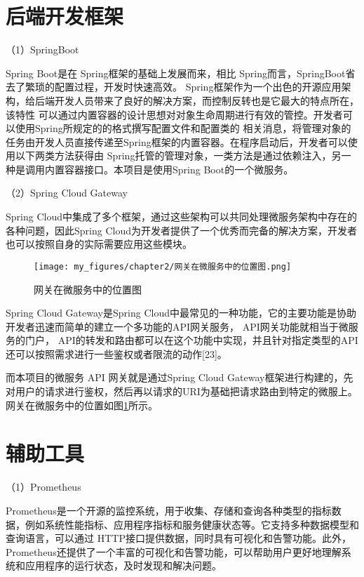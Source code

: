 \section{后端开发框架}

（1）SpringBoot


Spring Boot是在 Spring框架的基础上发展而来\cite{konggyong2015keji}，相比 Spring而言，SpringBoot省去了繁琐的配置过程，开发时快速高效。
Spring框架作为一个出色的开源应用架构，给后端开发人员带来了良好的解决方案，而控制反转也是它最大的特点所在，该特性
可以通过内置容器的设计思想对对象生命周期进行有效的管控。开发者可以使用Spring所规定的的格式撰写配置文件和配置类的
相关消息，将管理对象的任务由开发人员直接传递至Spring框架的内置容器\cite{kongqingyong201ji}。在程序启动后，开发者可以使用以下两类方法获得由
Spring托管的管理对象，一类方法是通过依赖注入，另一种是调用内置容器接口。本项目是使用Spring Boot的一个微服务。


（2）Spring Cloud Gateway

Spring Cloud中集成了多个框架，通过这些架构可以共同处理微服务架构中存在的各种问题\cite{kon2201ji}，因此Spring Cloud为开发者提供了一个优秀而完备的解决方案，开发者也可以按照自身的实际需要应用这些模块。

\begin{figure}[h]
    \centering
    \texttt{[image: my\_figures/chapter2/网关在微服务中的位置图.png]}
    \caption{网关在微服务中的位置图}
    \label{fig:/网关在微服务中的位置图}
\end{figure}

Spring Cloud Gateway是Spring Cloud中最常见的一种功能，它的主要功能是协助开发者迅速而简单的建立一个多功能的API网关服务， API网关功能就相当于微服务的门户， API的转发和路由都可以在这个功能中实现，并且针对指定类型的API还可以按照需求进行一些鉴权或者限流的动作[23]。

而本项目的微服务 API 网关就是通过Spring Cloud Gateway框架进行构建的，先对用户的请求进行鉴权，然后再以请求的URI为基础把请求路由到特定的微服上。网关在微服务中的位置如图\ref{fig:/网关在微服务中的位置图}所示。

\section{辅助工具}

（1）Prometheus

Prometheus是一个开源的监控系统，用于收集、存储和查询各种类型的指标数据\cite{kongq5keji}，例如系统性能指标、应用程序指标和服务健康状态等。它支持多种数据模型和查询语言，可以通过
HTTP接口提供数据，同时具有可视化和告警功能。此外，Prometheus还提供了一个丰富的可视化和告警功能\cite{kongqingy2015keji}，可以帮助用户更好地理解系统和应用程序的运行状态，及时发现和解决问题。

